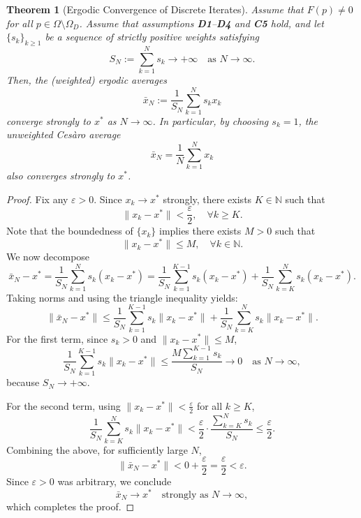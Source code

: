 \documentclass[hidelinks,11 pt]{article}
\numberwithin{equation}{section}
\newtheorem{theorem}{Theorem}[section]
\theoremstyle{definition}  %
\numberwithin{equation}{section}
\numberwithin{theorem}{section}
\begin{document}
\begin{theorem}[Ergodic Convergence of Discrete Iterates]
Assume that \(F(p) \neq 0\) for all \(p \in \Omega \setminus \Omega_D\). Assume that assumptions \textbf{D1}–\textbf{D4} and \textbf{C5} hold, and let \( \{s_k\}_{k \geq 1} \) be a sequence of strictly positive weights satisfying
\[
S_N := \sum_{k=1}^N s_k \to +\infty \quad \text{as } N \to \infty.
\]
Then, the (weighted) ergodic averages
\[
\bar{x}_N := \frac{1}{S_N} \sum_{k=1}^N s_k x_k
\]
converge strongly to \( x^* \) as \( N \to \infty \). In particular, by choosing \( s_k = 1 \), the unweighted Cesàro average
\[
\bar{x}_N = \frac{1}{N} \sum_{k=1}^N x_k
\]
also converges strongly to \( x^* \).
\end{theorem}

\begin{proof}
Fix any \( \varepsilon > 0 \). Since \( x_k \to x^* \) strongly, there exists \( K \in \mathbb{N} \) such that
\[
\|x_k - x^*\| < \frac{\varepsilon}{2}, \quad \forall k \geq K.
\]
Note that the boundedness of \( \{x_k\} \) implies there exists \( M > 0 \) such that
\[
\|x_k - x^*\| \leq M, \quad \forall k \in \mathbb{N}.
\]
We now decompose
\[
\bar{x}_N - x^* = \frac{1}{S_N} \sum_{k=1}^N s_k (x_k - x^*) = \frac{1}{S_N} \sum_{k=1}^{K-1} s_k (x_k - x^*) + \frac{1}{S_N} \sum_{k=K}^N s_k (x_k - x^*).
\]
Taking norms and using the triangle inequality yields:
\[
\|\bar{x}_N - x^*\| \leq \frac{1}{S_N} \sum_{k=1}^{K-1} s_k \|x_k - x^*\| + \frac{1}{S_N} \sum_{k=K}^N s_k \|x_k - x^*\|.
\]
For the first term, since \( s_k > 0 \) and \( \|x_k - x^*\| \leq M \),
\[
\frac{1}{S_N} \sum_{k=1}^{K-1} s_k \|x_k - x^*\| \leq \frac{M \sum_{k=1}^{K-1} s_k }{S_N} \to 0 \quad \text{as } N \to \infty,
\]
because \( S_N \to +\infty \).

For the second term, using \( \|x_k - x^*\| < \frac{\varepsilon}{2} \) for all \( k \geq K \),
\[
\frac{1}{S_N} \sum_{k=K}^N s_k \|x_k - x^*\| < \frac{\varepsilon}{2} \cdot \frac{ \sum_{k=K}^N s_k }{ S_N } \leq \frac{\varepsilon}{2}.
\]
Combining the above, for sufficiently large \( N \),
\[
\|\bar{x}_N - x^*\| < 0 + \frac{\varepsilon}{2} = \frac{\varepsilon}{2} < \varepsilon.
\]
Since \( \varepsilon > 0 \) was arbitrary, we conclude
\[
\bar{x}_N \to x^* \quad \text{strongly as } N \to \infty, 
\]
which completes the proof.
\end{proof}
\end{document}
